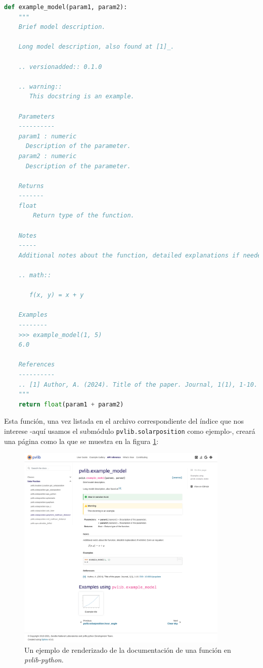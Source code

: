 \begin{lstlisting}[language=Python, caption={Ejemplo de documentación de una función en \textit{pvlib-python}.}, label={lst:doc_function_example}]
def example_model(param1, param2):
    """
    Brief model description.

    Long model description, also found at [1]_.

    .. versionadded:: 0.1.0

    .. warning::
       This docstring is an example.

    Parameters
    ----------
    param1 : numeric
      Description of the parameter.
    param2 : numeric
      Description of the parameter.

    Returns
    -------
    float
        Return type of the function.

    Notes
    -----
    Additional notes about the function, detailed explanations if needed. Even an equation:

    .. math::

       f(x, y) = x + y

    Examples
    --------
    >>> example_model(1, 5)
    6.0

    References
    ----------
    .. [1] Author, A. (2024). Title of the paper. Journal, 1(1), 1-10. :doi:`10.0001/populate`
    """
    return float(param1 + param2)
\end{lstlisting}

Esta función, una vez listada en el archivo correspondiente del índice que nos interese -aquí usamos el submódulo \texttt{pvlib.solarposition} como ejemplo-, creará una página como la que se muestra en la figura \ref{fig:doc_function_example}:

\begin{figure}[H]
    \centering
    \includegraphics[width=0.9\textwidth]{./images/doc_example/function_stretch.png}
    \caption{Un ejemplo de renderizado de la documentación de una función en \textit{pvlib-python}.}
    \label{fig:doc_function_example}
\end{figure}

